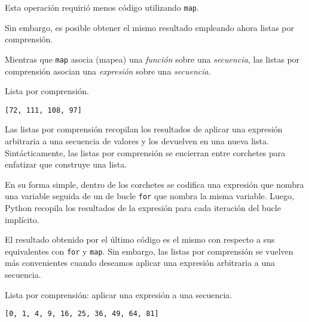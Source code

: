 Esta operación requirió menos código utilizando \texttt{map}.

Sin embargo, es posible obtener el mismo resultado empleando ahora
listas por comprensión.

Mientras que \texttt{map} asocia (mapea) una \emph{función} sobre una
\emph{secuencia}, las listas por comprensión asocian una
\emph{expresión} sobre una \emph{secuencia}.\\

\begin{code} Lista por comprensión.

\begin{Shaded}
\begin{Highlighting}[]
\OperatorTok{=}\NormalTok{ [} \NormalTok{]}
\end{Highlighting}
\end{Shaded}

\begin{verbatim}
[72, 111, 108, 97]
\end{verbatim}
\end{code}

Las listas por comprensión recopilan los resultados de aplicar una
expresión arbitraria a una secuencia de valores y los devuelven en una
nueva lista. Sintácticamente, las listas por comprensión se encierran
entre corchetes para enfatizar que construye una lista.

En su forma simple, dentro de los corchetes se codifica una expresión
que nombra una variable seguida de un de bucle \texttt{for} que nombra
la misma variable. Luego, Python recopila los resultados de la expresión
para cada iteración del bucle implícito.

El resultado obtenido por el último código es el mismo con respecto a
sus equivalentes con \texttt{for} y \texttt{map}. Sin embargo, las
listas por comprensión se vuelven más convenientes cuando deseamos
aplicar una expresión arbitraria a una secuencia. \\

\begin{code} Lista por comprensión: aplicar una expresión a una secuencia.
\begin{Shaded}
\begin{Highlighting}[]
\NormalTok{[x}\OperatorTok{**}  \NormalTok{(}\NormalTok{)]}
\end{Highlighting}
\end{Shaded}

\begin{verbatim}
[0, 1, 4, 9, 16, 25, 36, 49, 64, 81]
\end{verbatim}
\label{code:listaPorComprension1}
\end{code}


